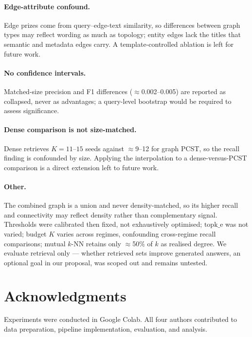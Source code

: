 \documentclass[11pt]{article}
\begin{document}
\paragraph{Edge-attribute confound.} Edge prizes come from query--edge-text similarity, so differences between graph types may reflect wording as much as topology; entity edges lack the titles that semantic and metadata edges carry. A template-controlled ablation is left for future work.

\paragraph{No confidence intervals.} Matched-size precision and F1 differences ($\approx$0.002--0.005) are reported as collapsed, never as advantages; a query-level bootstrap would be required to assess significance.

\paragraph{Dense comparison is not size-matched.} Dense retrieves $K{=}11$--$15$ seeds against $\approx$9--12 for graph PCST, so the recall finding is confounded by size. Applying the  interpolation to a dense-versus-PCST comparison is a direct extension left to future work.

\paragraph{Other.} The combined graph is a union and never density-matched, so its higher recall and connectivity may reflect density rather than complementary signal. Thresholds were calibrated then fixed, not exhaustively optimised; $\mathrm{topk\_e}$ was not varied; budget $K$ varies across regimes, confounding cross-regime recall comparisons; mutual $k$-NN retains only $\approx$50\% of $k$ as realised degree. We evaluate retrieval only --- whether retrieved sets improve generated answers, an optional goal in our proposal, was scoped out and remains untested.

\section*{Acknowledgments}

Experiments were conducted in Google Colab. All four authors contributed to data preparation, pipeline implementation, evaluation, and analysis.


\end{document}
